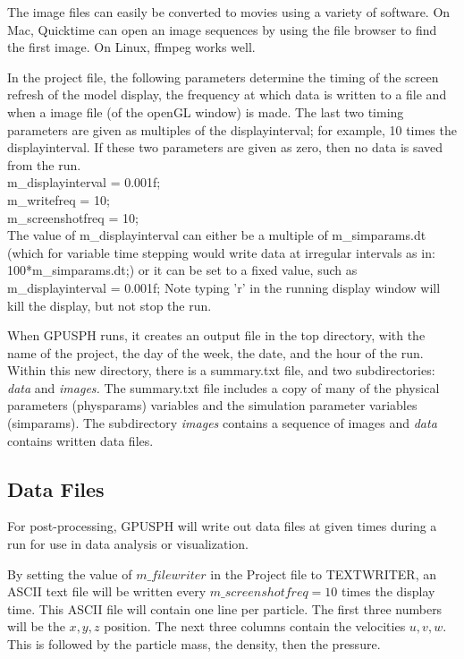 \documentclass[12pt]{memoir}
\begin{document}
{{{{The image files can easily be converted to movies using a variety of
software. On Mac, Quicktime can open an image sequences by using the
file browser to find the first image. On Linux, ffmpeg works well.


In the project file, the following parameters determine the timing of
the screen refresh of the model display, the frequency at which data is
written to a file and when a image file (of the openGL window) is made.
The last two timing parameters are given as multiples of the
displayinterval; for example, 10 times the displayinterval. If these
two parameters are given as zero, then no data is saved from the run.
\\



\noindent m\_displayinterval = 0.001f; \\ m\_writefreq = 10;\\
m\_screenshotfreq = 10;\\

The value of m\_displayinterval can either be a multiple of
m\_simparams.dt (which for variable time stepping would write data at
irregular intervals as in: 100*m\_simparams.dt;) or it can be set to a
fixed value, such as m\_displayinterval = 0.001f; Note typing 'r' in
the running display window will kill the display, but not stop the run.

When GPUSPH runs, it creates an output file in the top directory, with
the name of the project, the day of the week, the date, and the hour of
the run. Within this new directory, there is a summary.txt file, and
two subdirectories: {\em data} and {\em images.} The summary.txt file
includes a copy of many of the physical parameters (physparams)
variables and the simulation parameter variables (simparams). The
subdirectory {\em images} contains a sequence of images and {\em data}
contains written data files.


\subsection{Data Files} For post-processing, GPUSPH will write out data
files at given times during a run for use in data analysis or
visualization.

By setting the value of $m\_filewriter$ in the Project file to
TEXTWRITER, an ASCII text file will be written every $ m\_screenshotfreq
= 10 $ times the display time. This ASCII file will contain one line
per particle. The first three numbers will be the $x, y, z$ position.
The next three columns contain the velocities $u, v, w$. This is
followed by the particle mass, the density, then the pressure.

}}}}
\end{document}
